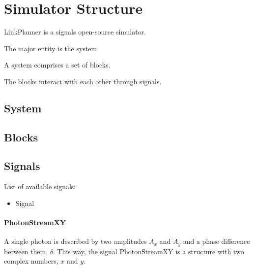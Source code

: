 
\chapter{Simulator Structure}

\begin{refsection}



LinkPlanner is a signals open-source simulator.

The major entity is the system.

A system comprises a set of blocks.

The blocks interact with each other through signals.

\section{System}

\section{Blocks}

\section{Signals}

List of available signals:

\begin{itemize}
    \item Signal

\end{itemize}

\subsubsection{PhotonStreamXY}
A single photon is described by two amplitudes $A_x$ and $A_y$ and a phase difference between them, $\delta$. This way, the signal PhotonStreamXY is a structure with two complex numbers, $x$ and $y$.



\end{refsection}
